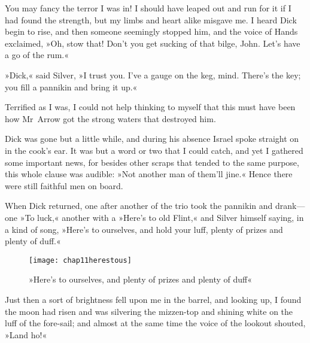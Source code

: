 You may fancy the terror I was in! I should have leaped out and run for it if I had found the strength, but my limbs and heart alike misgave me. I heard Dick begin to rise, and then someone seemingly stopped him, and the voice of Hands exclaimed, »Oh, stow that! Don't you get sucking of that bilge, John. Let's have a go of the rum.«

»Dick,« said Silver, »I trust you. I've a gauge on the keg, mind. There's the key; you fill a pannikin and bring it up.«

Terrified as I was, I could not help thinking to myself that this must have been how Mr~Arrow got the strong waters that destroyed him.

Dick was gone but a little while, and during his absence Israel spoke straight on in the cook's ear. It was but a word or two that I could catch, and yet I gathered some important news, for besides other scraps that tended to the same purpose, this whole clause was audible: »Not another man of them'll jine.« Hence there were still faithful men on board.

When Dick returned, one after another of the trio took the pannikin and drank—one »To luck,« another with a »Here's to old Flint,« and Silver himself saying, in a kind of song, »Here's to ourselves, and hold your luff, plenty of prizes and plenty of duff.«

 \begin{figure}[p]
\centering
\texttt{[image: chap11herestous]}
\caption[»Here's to ourselves«]{»Here's to ourselves, and plenty of prizes and plenty of duff«}
\end{figure}

Just then a sort of brightness fell upon me in the barrel, and looking up, I found the moon had risen and was silvering the mizzen-top and shining white on the luff of the fore-sail; and almost at the same time the voice of the lookout shouted, »Land ho!«
